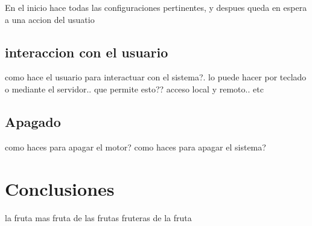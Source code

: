 \documentclass[a4paper]{article}
\begin{document}
En el inicio hace todas las configuraciones pertinentes, y despues queda en espera a una accion del usuatio


\subsection{interaccion con el usuario} %
\label{sub:interaccion_con_el_usuario}

como hace el usuario para interactuar con el sistema?. lo puede hacer por teclado o mediante el servidor.. que permite esto?? acceso local y remoto.. etc


\subsection{Apagado} %
\label{sub:apagado}

como haces para apagar el motor? como haces para apagar el sistema?




\section{Conclusiones} %
\label{sec:conclusiones}

la fruta mas fruta de las frutas fruteras de la fruta









 
\end{document}
